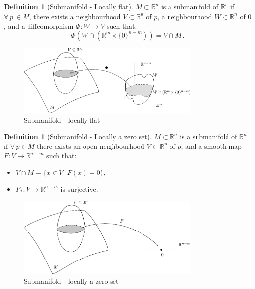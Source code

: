 \documentclass[a4paper,11pt,titlepage, article, oneside]{memoir}
\numberwithin{equation}{section}
\theoremstyle{definition}
\newtheorem{definition}[theorem]{Definition}
\theoremstyle{remark}
\newcommand{\rfield}{\mathbb{R}}
\begin{document}
\begin{definition}[Submanifold - Locally flat] \label{sub2}
  $M \subset \rfield^n$ is a submanifold of $\rfield^n$ if $\forall \, p  \,\in M$, there exists a neighbourhood $V \subset \rfield^n$ of $p$, a neighbourhood $W \subset \rfield^n$ of $0$, and a diffeomorphism $\Phi \colon W \rightarrow V$ such that:
  \[\Phi \left ( W \cap (\rfield^m \times \{0\}^{n-m}) \right ) = V \cap M \, .\]
  \begin{figure}[H]
  \label{Fig:submanifold2}
     \centering
     \includegraphics[width=0.8\textwidth]{Images/submanifold2.pdf} 
     \caption{Submanifold - locally flat}      
\end{figure}
\end{definition}

\begin{definition}[Submanifold - Locally  a zero set] \label{sub3}
$M \subset \rfield^n$ is a submanifold of $\rfield^n$ if
$\forall \, p \in M$ there exists an open neighbourhood $V \subset \rfield^n$ of $p$, and a smooth map $F \colon V \rightarrow \rfield^{n-m}$ such that:
\begin{itemize}
\item $V \cap M = \{x \in V \, | \, F(x) = 0\}$,
\item $F_* \colon V \rightarrow \rfield^{n-m}$ is surjective.
\end{itemize}

\begin{figure}[H]
  \label{Fig:submanifold3}
     \centering
     \includegraphics[width=0.8\textwidth]{Images/submanifold3.pdf} 
     \caption{Submanifold - locally a zero set}      
\end{figure}
\end{definition}
\end{document}
